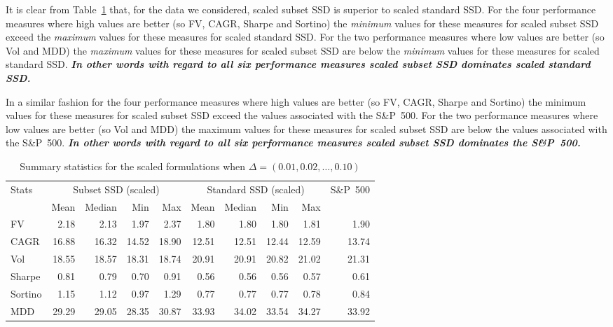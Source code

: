 It is clear from Table~\ref{table3} that, for the data we considered, scaled subset SSD is superior to scaled standard SSD. For the four 
performance measures where high values are better (so FV, CAGR, Sharpe and Sortino) the \emph{minimum} values for these measures for 
scaled subset SSD exceed the \emph{maximum} values for these measures for scaled standard SSD.  For the two performance measures 
where low values are better (so Vol and MDD) the \emph{maximum} values for these measures for scaled subset SSD are below the 
\emph{minimum} values for these measures for scaled standard SSD.  
\emph{\textbf{In other words with regard to all six performance measures scaled subset SSD dominates scaled standard SSD.}}

In a similar fashion
for the four 
performance measures where high values are better (so FV, CAGR, Sharpe and Sortino) the minimum values for these measures for 
scaled subset SSD exceed the values associated with the S\&P~500.
 For the two performance measures 
where low values are better (so Vol and MDD) the maximum values for these measures for scaled subset SSD are 
below the values associated with the S\&P~500.
\emph{\textbf{In other words with regard to all six performance measures scaled subset SSD dominates the S\&P~500.}}




\begin{table}[!ht]
\centering
{\small
\renewcommand{\arraystretch}{1.5}
\begin{tabular}{|l|rrrr|rrrr|r|}
\hline
\multirow{2}{*}{Stats} & \multicolumn{4}{c|}{Subset SSD (scaled)} & \multicolumn{4}{c|}{Standard SSD (scaled)} & S\&P~500\\
\cline{2-9}
& Mean & Median & Min & Max & Mean & Median & Min & Max  &\\
\hline
FV & 2.18 & 2.13 & 1.97 & 2.37 & 1.80 & 1.80 & 1.80 & 1.81  & 1.90\\
CAGR & 16.88 & 16.32 & 14.52 & 18.90 & 12.51 & 12.51 & 12.44 & 12.59  & 13.74\\
Vol & 18.55 & 18.57 & 18.31 & 18.74 & 20.91 & 20.91 & 20.82 & 21.02 & 21.31\\
Sharpe & 0.81 & 0.79 & 0.70 & 0.91 & 0.56 & 0.56 & 0.56 & 0.57 & 0.61 \\
Sortino & 1.15 & 1.12 & 0.97 & 1.29 & 0.77 & 0.77 & 0.77 & 0.78  & 0.84\\
MDD & 29.29 & 29.05 & 28.35 & 30.87 & 33.93 & 34.02 & 33.54 & 34.27 & 33.92 \\
\hline
\end{tabular}
}
\caption{Summary statistics for the scaled formulations when $\Delta = (0.01, 0.02, \ldots, 0.10)$}
\label{table3}
\end{table}



